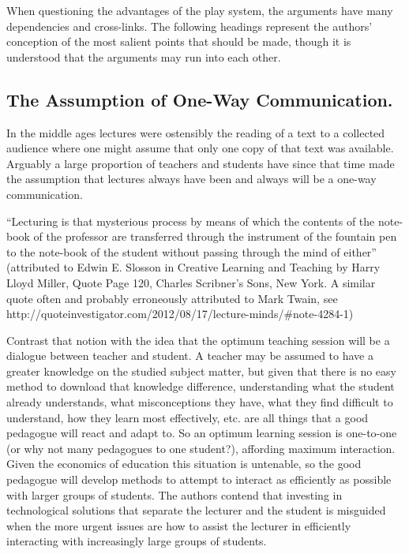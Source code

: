 \documentclass[a4paper,10pt]{article}
\begin{document}
 When questioning the advantages of the play system, the arguments have many dependencies and cross-links. The following headings represent the authors' conception of the most salient points that should be made, though it is understood that the arguments may run into each other.

\subsection{The Assumption of One-Way Communication. }
In the middle ages lectures were ostensibly the reading of a text to a collected audience where one might assume that only one copy of that text was available. Arguably a large proportion of teachers and students have since that time made the assumption that lectures always have been and always will be a one-way communication. 

``Lecturing is that mysterious process by means of which the contents of the note-book of the professor are transferred through the instrument of the fountain pen to the note-book of the student without passing through the mind of either''
(attributed to Edwin E. Slosson in Creative Learning and Teaching by Harry Lloyd Miller, Quote Page 120, Charles Scribner’s Sons, New York. A similar quote often and probably erroneously attributed to Mark Twain, see http://quoteinvestigator.com/2012/08/17/lecture-minds/\#note-4284-1)

Contrast that notion with the idea that the optimum teaching session will be a dialogue between teacher and student. A teacher may be assumed to have a greater knowledge on the studied subject matter, but given that there is no easy method to download that knowledge difference, understanding what the student already understands, what misconceptions they have, what they find difficult to understand, how they learn most effectively, etc. are all things that a good pedagogue will react and adapt to\footnotemark. So an optimum learning session is one-to-one (or why not many pedagogues to one student?), affording maximum interaction. Given the economics of education this situation is untenable, so the good pedagogue will develop methods to attempt to interact as efficiently as possible with larger groups of students. The authors contend that investing in technological solutions that separate the lecturer and the student is misguided when the more urgent issues are how to assist the lecturer in efficiently interacting with increasingly large groups of students.

\end{document}
